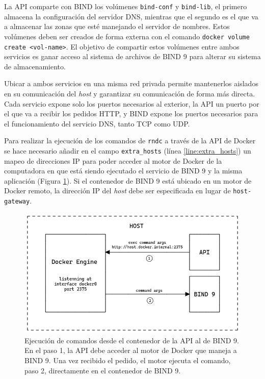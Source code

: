 La API comparte con BIND los volúmenes \verb|bind-conf| y \verb|bind-lib|, el primero almacena la configuración del servidor DNS, mientras que el segundo es el que va a almacenar las zonas que esté manejando el servidor de nombres. Estos volúmenes deben ser creados de forma externa con el comando \verb|docker volume create <vol-name>|. El objetivo de compartir estos volúmenes entre ambos servicios es ganar acceso al sistema de archivos de BIND 9 para alterar su sistema de almacenamiento.

Ubicar a ambos servicios en una misma red privada permite mantenerlos aislados en su comunicación del \textit{host} y garantizar su comunicación de forma más directa. Cada servicio expone solo los puertos necesarios al exterior, la API un puerto por el que va a recibir los pedidos HTTP, y BIND expone los puertos necesarios para el funcionamiento del servicio DNS, tanto TCP como UDP.

Para realizar la ejecución de los comandos de \verb|rndc| a través de la API de Docker se hace necesario añadir en el campo \verb|extra_hosts| (línea \ref{line:extra_hosts}) un mapeo de direcciones IP para poder acceder al motor de Docker de la computadora en que está siendo ejecutado el servicio de BIND 9 y la misma aplicación (Figura \ref{fig:extra_hosts}). Si el contenedor de BIND 9 está ubicado en  un motor de Docker remoto, la dirección IP del \textit{host} debe ser especificada en lugar de \verb|host-gateway|.

\begin{figure}[!ht]
    \centering
    \includegraphics[width=\linewidth]{draws/extra_hosts.png}
    \caption{Ejecución de comandos desde el contenedor de la API al de BIND 9. En el paso 1, la API debe acceder al motor de Docker que maneja a BIND 9. Una vez recibido el pedido, el motor ejecuta el comando, paso 2, directamente en el contenedor de BIND 9.}
    \label{fig:extra_hosts}
\end{figure}

